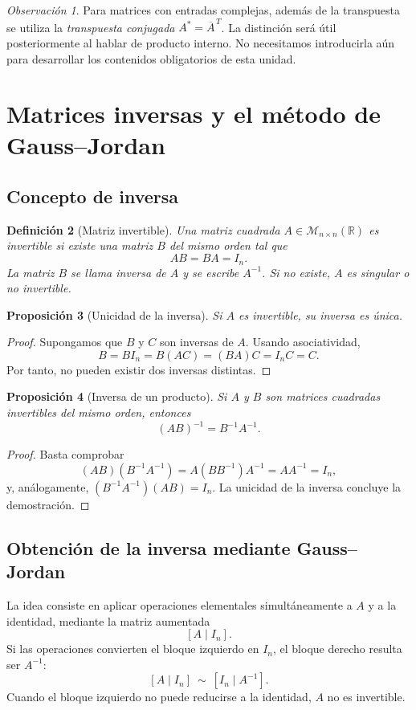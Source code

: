 \documentclass[12pt]{article}
\newtheorem{definicion}{Definición}[section]
\newtheorem{proposicion}[definicion]{Proposición}
\theoremstyle{remark}
\newtheorem{observacion}[definicion]{Observación}
\newcommand{\R}{\mathbb{R}}
\newcommand{\Mat}[2]{\mathcal{M}_{#1\times #2}}
\begin{document}
\begin{observacion}
Para matrices con entradas complejas, además de la transpuesta se utiliza la \emph{transpuesta conjugada} $A^*=\overline{A}^{\,T}$. La distinción será útil posteriormente al hablar de producto interno. No necesitamos introducirla aún para desarrollar los contenidos obligatorios de esta unidad.
\end{observacion}

\section{Matrices inversas y el método de Gauss--Jordan}
\subsection{Concepto de inversa}
\begin{definicion}[Matriz invertible]
Una matriz cuadrada $A\in\Mat{n}{n}(\R)$ es \emph{invertible} si existe una matriz $B$ del mismo orden tal que
\[
AB=BA=I_n.
\]
La matriz $B$ se llama \emph{inversa} de $A$ y se escribe $A^{-1}$. Si no existe, $A$ es \emph{singular} o \emph{no invertible}.
\end{definicion}

\begin{proposicion}[Unicidad de la inversa]
Si $A$ es invertible, su inversa es única.
\end{proposicion}
\begin{proof}
Supongamos que $B$ y $C$ son inversas de $A$. Usando asociatividad,
\[
B=BI_n=B(AC)=(BA)C=I_nC=C.
\]
Por tanto, no pueden existir dos inversas distintas.
\end{proof}

\begin{proposicion}[Inversa de un producto]
Si $A$ y $B$ son matrices cuadradas invertibles del mismo orden, entonces
\[
\boxed{(AB)^{-1}=B^{-1}A^{-1}.}
\]
\end{proposicion}
\begin{proof}
Basta comprobar
\[
(AB)(B^{-1}A^{-1})=A(BB^{-1})A^{-1}=AA^{-1}=I_n,
\]
y, análogamente, $(B^{-1}A^{-1})(AB)=I_n$. La unicidad de la inversa concluye la demostración.
\end{proof}

\subsection{Obtención de la inversa mediante Gauss--Jordan}
La idea consiste en aplicar operaciones elementales simultáneamente a $A$ y a la identidad, mediante la matriz aumentada
\[
\left[A\mid I_n\right].
\]
Si las operaciones convierten el bloque izquierdo en $I_n$, el bloque derecho resulta ser $A^{-1}$:
\[
\boxed{[A\mid I_n]\ \sim\ [I_n\mid A^{-1}].}
\]
Cuando el bloque izquierdo no puede reducirse a la identidad, $A$ no es invertible.
\end{document}
